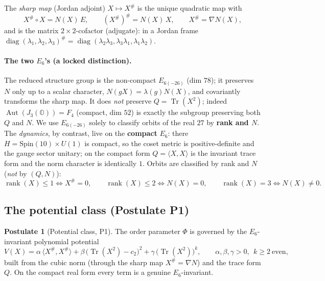\documentclass[11pt]{article}
\theoremstyle{plain}
\theoremstyle{definition}
\newtheorem{postulate}[theorem]{Postulate}
\theoremstyle{remark}
\begin{document}
The \emph{sharp map} (Jordan adjoint) $X\mapsto X^\#$ is the unique quadratic map with
\begin{equation}
\label{eq:potential:sharp}
X^\#\circ X=N(X)\,E,\qquad (X^\#)^\#=N(X)\,X,\qquad X^\#=\nabla N(X),
\end{equation}
and is the matrix $2\times2$-cofactor (adjugate): in a Jordan frame
$\operatorname{diag}(\lambda_1,\lambda_2,\lambda_3)^\#
=\operatorname{diag}(\lambda_2\lambda_3,\lambda_3\lambda_1,\lambda_1\lambda_2)$.

\paragraph{The two $E_6$'s (a locked distinction).}
The reduced structure group is the non-compact $E_{6(-26)}$ (dim $78$); it preserves $N$ only
up to a scalar character, $N(gX)=\lambda(g)N(X)$, and covariantly transforms the sharp map.
It does \emph{not} preserve $Q=\operatorname{Tr}(X^2)$; indeed $\operatorname{Aut}(J_3(\mathbb O))=F_4$
(compact, dim $52$) is exactly the subgroup preserving both $Q$ and $N$. We use $E_{6(-26)}$
solely to classify orbits of the real $27$ by \textbf{rank and $N$}. The \emph{dynamics}, by
contrast, live on the \textbf{compact} $E_6$: there $H=\mathrm{Spin}(10)\times U(1)$ is
compact, so the coset metric is positive-definite and the gauge sector unitary; on the
compact form $Q=\langle X,X\rangle$ is the invariant trace form and the norm character is
identically $1$. Orbits are classified by rank and $N$ (\emph{not} by $(Q,N)$):
\begin{equation}
\label{eq:potential:rank}
\operatorname{rank}(X)\le1\iff X^\#=0,\qquad
\operatorname{rank}(X)\le2\iff N(X)=0,\qquad
\operatorname{rank}(X)=3\iff N(X)\neq0.
\end{equation}

\subsection{The potential class (Postulate P1)}
\label{sec:potential:class}

\begin{postulate}[Potential class, P1]
\label{post:potential:P1}
The order parameter $\Phi$ is governed by the $E_6$-invariant polynomial potential
\begin{equation}
\label{eq:potential:v}
V(X)=\alpha\,\langle X^\#,X^\#\rangle
+\beta\,\bigl(\operatorname{Tr}(X^2)-c_2\bigr)^2
+\gamma\,\bigl(\operatorname{Tr}(X^2)\bigr)^k,
\qquad \alpha,\beta,\gamma>0,\ \ k\ge2\ \text{even},
\end{equation}
built from the cubic norm (through the sharp map $X^\#=\nabla N$) and the trace form $Q$.
On the compact real form every term is a genuine $E_6$-invariant.
\end{postulate}
\end{document}
